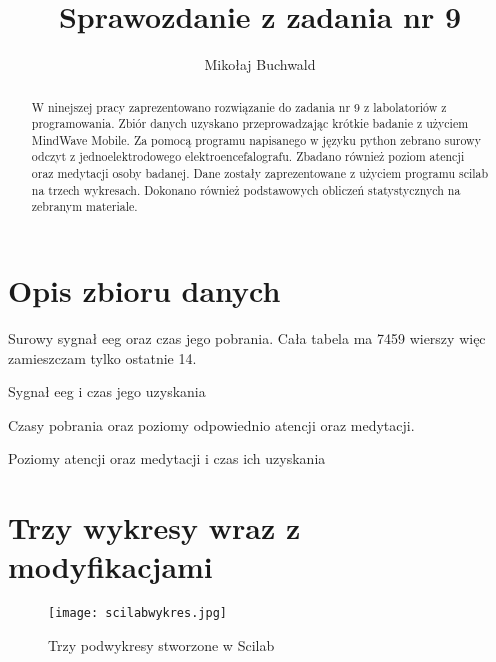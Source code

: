 \documentclass{article}
\begin{document}
\title{Sprawozdanie z zadania nr 9}
\author{Mikołaj Buchwald}

\maketitle

\begin{abstract}
    W ninejszej pracy zaprezentowano rozwiązanie do zadania nr 9 z labolatoriów z programowania. Zbiór danych uzyskano przeprowadzając krótkie badanie z użyciem MindWave Mobile. Za pomocą programu napisanego w języku python zebrano surowy odczyt z jednoelektrodowego elektroencefalografu. Zbadano również poziom atencji oraz medytacji osoby badanej. Dane zostały zaprezentowane z użyciem programu scilab na trzech wykresach. Dokonano również podstawowych obliczeń statystycznych na zebranym materiale. 
\end{abstract}

\newpage
\section{Opis zbioru danych}
Surowy sygnał eeg oraz czas jego pobrania. Cała tabela ma 7459 wierszy więc zamieszczam tylko ostatnie 14.
\newline
\begin{table}[h]
\begin{center}
\caption[Table caption text]{Sygnał eeg i czas jego uzyskania}
\end{center}
\end{table}

Czasy pobrania oraz poziomy odpowiednio atencji oraz medytacji.
\newline
\begin{table}[h]
\center \caption[Table caption text]{Poziomy atencji oraz medytacji i czas ich uzyskania}
\end{table}
\newpage
\section{Trzy wykresy wraz z modyfikacjami}

\begin{figure}[htbp]
    \centering
    \texttt{[image: scilabwykres.jpg]}
    \caption{Trzy podwykresy stworzone w Scilab}
\end{figure}

\end{document}
